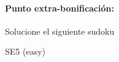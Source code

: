 \documentclass[fleqn]{article}
\begin{document}
 \paragraph*{Punto extra-bonificación:} Solucione el siguiente sudoku
 \cluefont{\Large}
 \renewcommand*{\puzzlefile}{se5.sud}
\begin{center}
\begin{minipage}{0.55\linewidth}\begin{center}
SE5 (easy) \\
\end{center}\end{minipage}
\end{center}
\end{document}
